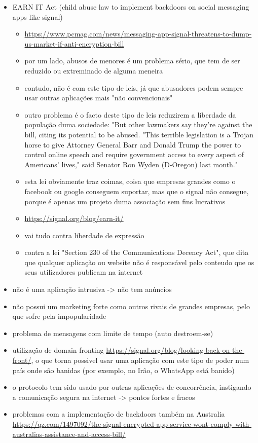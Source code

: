 \begin{itemize}
   \item EARN IT Act (child abuse law to implement backdoors on social messaging apps like signal)
   \begin{itemize}
      \item \url{https://www.pcmag.com/news/messaging-app-signal-threatens-to-dump-us-market-if-anti-encryption-bill}
      \item por um lado, abusos de menores é um problema sério, que tem de ser reduzido ou extreminado de alguma meneira
      \item contudo, não é com este tipo de leis, já que abusadores podem sempre usar outras aplicações mais "não convencionais" 
      \item outro problema é o facto deste tipo de leis reduzirem a liberdade da população duma sociedade: "But other lawmakers say they're against the bill, citing its potential to be abused. "This terrible legislation is a Trojan horse to give Attorney General Barr and Donald Trump the power to control online speech and require government access to every aspect of Americans' lives," said Senator Ron Wyden (D-Oregon) last month."
      \item esta lei obviamente traz coimas, coisa que empresas grandes como o facebook ou google conseguem suportar, mas que o signal não consegue, porque é apenas um projeto duma associação sem fins lucrativos
      \item \url{https://signal.org/blog/earn-it/}
      \item vai tudo contra liberdade de expressão
      \item contra a lei "Section 230 of the Communications Decency Act", que dita que qualquer aplicação ou website não é responsável pelo conteudo que os seus utilizadores publicam na internet
   \end{itemize}
   \item não é uma aplicação intrusiva -> não tem anúncios
   \item não possui um marketing forte como outros rivais de grandes empresas, pelo que sofre pela impopularidade
   \item problema de mensagens com limite de tempo (auto destroem-se)
   \item utilização de domain fronting \url{https://signal.org/blog/looking-back-on-the-front/}, o que torna possivel usar uma aplicação com este tipo de poder num país onde são banidas (por exemplo, no Irão, o WhatsApp está banido)
   \item o protocolo tem sido usado por outras aplicações de concorrência, instigando a comunicação segura na internet -> pontos fortes e fracos
   \item problemas com a implementação de backdoors também na Australia \url{https://qz.com/1497092/the-signal-encrypted-app-service-wont-comply-with-australias-assistance-and-access-bill/}
\end{itemize}

